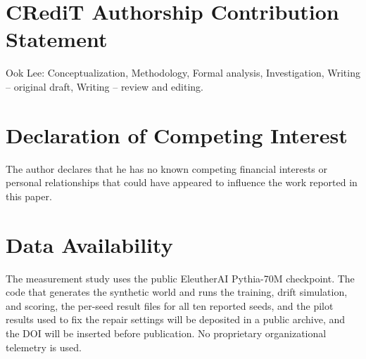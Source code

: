 \documentclass[journal]{IEEEtran}
\begin{document}
\section*{CRediT Authorship Contribution Statement}
Ook Lee: Conceptualization, Methodology, Formal analysis, Investigation, Writing -- original draft, Writing -- review and editing.

\section*{Declaration of Competing Interest}
The author declares that he has no known competing financial interests or personal relationships that could have appeared to influence the work reported in this paper.

\section*{Data Availability}
The measurement study uses the public EleutherAI Pythia-70M checkpoint. The code that generates the synthetic world and runs the training, drift simulation, and scoring, the per-seed result files for all ten reported seeds, and the pilot results used to fix the repair settings will be deposited in a public archive, and the DOI will be inserted before publication. No proprietary organizational telemetry is used.
\end{document}

